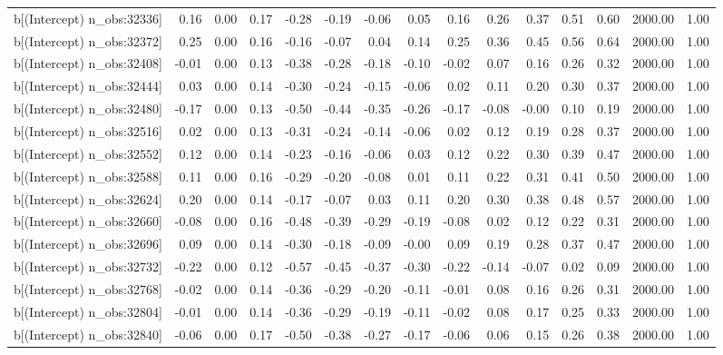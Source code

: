 \begin{table}[ht]
\begin{tabular}{rrrrrrrrrrrrrrr}
  b[(Intercept) n\_obs:32336] & 0.16 & 0.00 & 0.17 & -0.28 & -0.19 & -0.06 & 0.05 & 0.16 & 0.26 & 0.37 & 0.51 & 0.60 & 2000.00 & 1.00 \\ 
  b[(Intercept) n\_obs:32372] & 0.25 & 0.00 & 0.16 & -0.16 & -0.07 & 0.04 & 0.14 & 0.25 & 0.36 & 0.45 & 0.56 & 0.64 & 2000.00 & 1.00 \\ 
  b[(Intercept) n\_obs:32408] & -0.01 & 0.00 & 0.13 & -0.38 & -0.28 & -0.18 & -0.10 & -0.02 & 0.07 & 0.16 & 0.26 & 0.32 & 2000.00 & 1.00 \\ 
  b[(Intercept) n\_obs:32444] & 0.03 & 0.00 & 0.14 & -0.30 & -0.24 & -0.15 & -0.06 & 0.02 & 0.11 & 0.20 & 0.30 & 0.37 & 2000.00 & 1.00 \\ 
  b[(Intercept) n\_obs:32480] & -0.17 & 0.00 & 0.13 & -0.50 & -0.44 & -0.35 & -0.26 & -0.17 & -0.08 & -0.00 & 0.10 & 0.19 & 2000.00 & 1.00 \\ 
  b[(Intercept) n\_obs:32516] & 0.02 & 0.00 & 0.13 & -0.31 & -0.24 & -0.14 & -0.06 & 0.02 & 0.12 & 0.19 & 0.28 & 0.37 & 2000.00 & 1.00 \\ 
  b[(Intercept) n\_obs:32552] & 0.12 & 0.00 & 0.14 & -0.23 & -0.16 & -0.06 & 0.03 & 0.12 & 0.22 & 0.30 & 0.39 & 0.47 & 2000.00 & 1.00 \\ 
  b[(Intercept) n\_obs:32588] & 0.11 & 0.00 & 0.16 & -0.29 & -0.20 & -0.08 & 0.01 & 0.11 & 0.22 & 0.31 & 0.41 & 0.50 & 2000.00 & 1.00 \\ 
  b[(Intercept) n\_obs:32624] & 0.20 & 0.00 & 0.14 & -0.17 & -0.07 & 0.03 & 0.11 & 0.20 & 0.30 & 0.38 & 0.48 & 0.57 & 2000.00 & 1.00 \\ 
  b[(Intercept) n\_obs:32660] & -0.08 & 0.00 & 0.16 & -0.48 & -0.39 & -0.29 & -0.19 & -0.08 & 0.02 & 0.12 & 0.22 & 0.31 & 2000.00 & 1.00 \\ 
  b[(Intercept) n\_obs:32696] & 0.09 & 0.00 & 0.14 & -0.30 & -0.18 & -0.09 & -0.00 & 0.09 & 0.19 & 0.28 & 0.37 & 0.47 & 2000.00 & 1.00 \\ 
  b[(Intercept) n\_obs:32732] & -0.22 & 0.00 & 0.12 & -0.57 & -0.45 & -0.37 & -0.30 & -0.22 & -0.14 & -0.07 & 0.02 & 0.09 & 2000.00 & 1.00 \\ 
  b[(Intercept) n\_obs:32768] & -0.02 & 0.00 & 0.14 & -0.36 & -0.29 & -0.20 & -0.11 & -0.01 & 0.08 & 0.16 & 0.26 & 0.31 & 2000.00 & 1.00 \\ 
  b[(Intercept) n\_obs:32804] & -0.01 & 0.00 & 0.14 & -0.36 & -0.29 & -0.19 & -0.11 & -0.02 & 0.08 & 0.17 & 0.25 & 0.33 & 2000.00 & 1.00 \\ 
  b[(Intercept) n\_obs:32840] & -0.06 & 0.00 & 0.17 & -0.50 & -0.38 & -0.27 & -0.17 & -0.06 & 0.06 & 0.15 & 0.26 & 0.38 & 2000.00 & 1.00 \\ 

\end{tabular}
\end{table}
